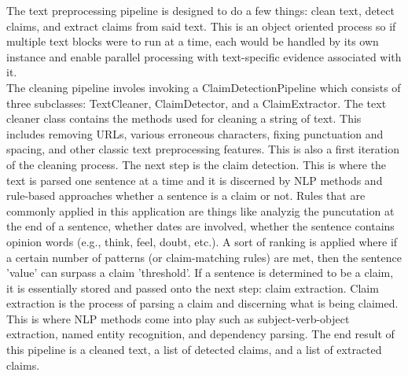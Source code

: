 \documentclass[11pt,letterpaper]{article}
\begin{document}
{

The text preprocessing pipeline is designed to do a few things: clean text, detect claims, and extract claims from said text. This is an object oriented process so if multiple text blocks were to run at a time, each would be handled by its own instance and enable parallel processing with text-specific evidence associated with it. \\

The cleaning pipeline involes invoking a ClaimDetectionPipeline which consists of three subclasses: TextCleaner, ClaimDetector, and a ClaimExtractor. The text cleaner class contains the methods used for cleaning a string of text. This includes removing URLs, various erroneous characters, fixing punctuation and spacing, and other classic text preprocessing features. This is also a first iteration of the cleaning process. The next step is the claim detection. This is where the text is parsed one sentence at a time and it is discerned by NLP methods and rule-based approaches whether a sentence is a claim or not. Rules that are commonly applied in this application are things like analyzig the puncutation at the end of a sentence, whether dates are involved, whether the sentence contains opinion words (e.g., think, feel, doubt, etc.). A sort of ranking is applied where if a certain number of patterns (or claim-matching rules) are met, then the sentence 'value' can surpass a claim 'threshold'. If a sentence is determined to be a claim, it is essentially stored and passed onto the next step: claim extraction. Claim extraction is the process of parsing a claim and discerning what is being claimed. This is where NLP methods come into play such as subject-verb-object extraction, named entity recognition, and dependency parsing. The end result of this pipeline is a cleaned text, a list of detected claims, and a list of extracted claims. \\

}
\end{document}
